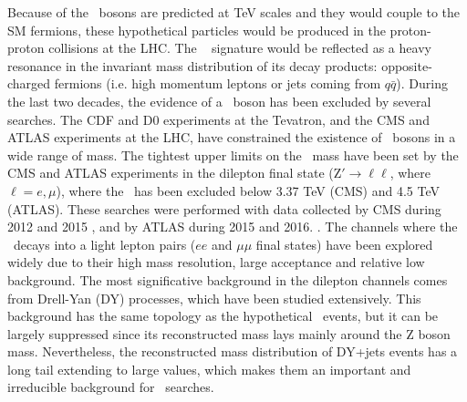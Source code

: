 
\noindent Because of the \Zprime~bosons are predicted at TeV scales and they would couple to the SM fermions, 
these hypothetical particles would be produced in the proton-proton collisions at the LHC. The \Zprime~ 
signature would be reflected as a heavy resonance in the invariant mass distribution of its 
decay products: opposite-charged fermions (i.e. high momentum leptons or jets coming from $q\bar{q}$). During 
the last two decades, the evidence of a \Zprime~boson has been excluded by several searches. 
The CDF \cite{CDFZprimedielectronbib,CDFZprimedimuonbib,CDFZprimeditaubib,CDFZprimeditopbib}  
and D0 \cite{D0Zprimesearchesbib,D0Zprimetodielectronbib,D0Zprimeditopbib} experiments at the Tevatron, and
the CMS \cite{CMSZprimetodileptonrun1run2, CMSZprimetodileptonrun1, CMSZprimetodileptonrun1sqrt7, CMSZprimetotautaurun1,
CMSZprimetotautauemu, CMSZprimetotautau2015, CMSZprimeto4leptons, CMSZprimeHplusZ, CMSZprimetotoptoprun1, CMSZprimetodibjetsrun1, CMSZprimedijetrun2} and 
ATLAS \cite{ATLASZprimetodileptonrun2, ATLASZprimetodilepton2015, ATLASZprimetodilepton2012, ATLASZprimetodileptonrun1, ATLASZprimetotautau2016,
ATLASZprimetotautau2015, ATLASZprimetotautaurun1, ATLASZprimetotautau2011, ATLASZprimetojet2015, ATLASZprimetobjet2015} experiments at the LHC, have 
constrained the existence of \Zprime~bosons in a wide range of mass. The tightest upper limits on the \Zprime~mass have 
been set by the CMS and ATLAS experiments in the dilepton final state (Z$'\rightarrow \ell\ell$, where $\ell=e, \mu$), where the \ZprimeSSM~has been 
excluded below 3.37 TeV (CMS) and 4.5 TeV (ATLAS). These searches were performed
with data collected by CMS during 2012 and 2015 \cite{CMSZprimetodileptonrun1run2}, and by ATLAS 
during 2015 and 2016. \cite{ATLASZprimetodileptonrun2}. The channels
where the \Zprime~decays into a light lepton pairs ($ee$ and $\mu\mu$ final states) have been explored
widely due to their high mass resolution, large acceptance and relative low background. The most significative 
background in the dilepton channels comes from Drell-Yan (DY) processes, which have been studied extensively. This 
background has the same topology as the hypothetical \Zprime~events, but it can be largely 
suppressed since its reconstructed mass lays mainly around the Z boson mass. Nevertheless, the 
reconstructed mass distribution of DY+jets events has a long tail extending to large values, which 
makes them an important and irreducible background for \Zprime~searches.  \\

